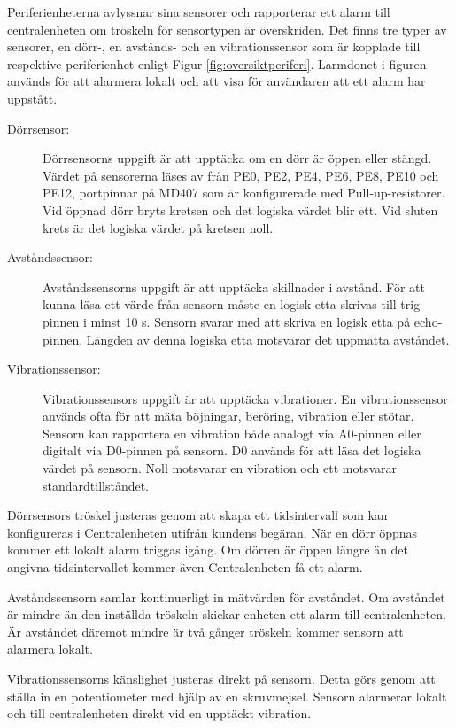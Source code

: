 \documentclass[a4paper]{article}
\begin{document}
Periferienheterna avlyssnar sina sensorer och rapporterar ett alarm till centralenheten om tröskeln för sensortypen är överskriden.
Det finns tre typer av sensorer, en dörr-, en avstånds- och en vibrationssensor som är kopplade till respektive periferienhet enligt Figur \ref{fig:oversiktperiferi}.
Larmdonet i figuren används för att alarmera lokalt och att visa för användaren att ett alarm har uppstått.

\begin{description}
    \item[Dörrsensor:] Dörrsensorns uppgift är att upptäcka om en dörr är öppen eller stängd.
    Värdet på sensorerna läses av från PE0, PE2, PE4, PE6, PE8, PE10 och PE12, portpinnar på MD407 som är konfigurerade med Pull-up-resistorer.
    Vid öppnad dörr bryts kretsen och det logiska värdet blir ett.
    Vid sluten krets är det logiska värdet på kretsen noll.

    \item[Avståndssensor:] Avståndssensorns uppgift är att upptäcka skillnader i avstånd.
    För att kunna läsa ett värde från sensorn måste en logisk etta skrivas till trig-pinnen i minst 10 \textmu s.
    Sensorn svarar med att skriva en logisk etta på echo-pinnen.
    Längden av denna logiska etta motsvarar det uppmätta avståndet.

    \item[Vibrationssensor:] Vibrationssensors uppgift är att upptäcka vibrationer.
    En vibrationssensor används ofta för att mäta böjningar, beröring, vibration eller stötar.
    Sensorn kan rapportera en vibration både analogt via A0-pinnen eller digitalt via D0-pinnen på sensorn.
    D0 används för att läsa det logiska värdet på sensorn.
    Noll motsvarar en vibration och ett motsvarar standardtillståndet.
\end{description}

Dörrsensors tröskel justeras genom att skapa ett tidsintervall som kan konfigureras i Centralenheten utifrån kundens begäran. 
När en dörr öppnas kommer ett lokalt alarm triggas igång. 
Om dörren är öppen längre än det angivna tidsintervallet kommer även Centralenheten få ett alarm. 

Avståndssensorn samlar kontinuerligt in mätvärden för avståndet.
Om avståndet är mindre än den inställda tröskeln skickar enheten ett alarm till centralenheten.
Är avståndet däremot mindre är två gånger tröskeln kommer sensorn att alarmera lokalt.

Vibrationssensorns känslighet justeras direkt på sensorn.
Detta görs genom att ställa in en potentiometer med hjälp av en skruvmejsel.
Sensorn alarmerar lokalt och till centralenheten direkt vid en upptäckt vibration.
\end{document}
